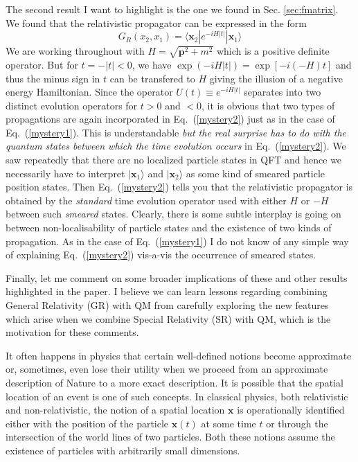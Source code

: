 \documentclass{article}
\def\eq#1{{Eq.~(\ref{#1})}}
\def\ket#1{|#1\rangle}                    %
\def\bk#1#2#3{{\langle #1|#2|#3\rangle}}  %
\begin{document}
The second result I want to highlight is the one we found in Sec. \ref{sec:fmatrix}. We found that the relativistic propagator can be expressed in the form
\begin{equation}
 G_R (x_2,x_1)  = \bk{\bm{x}_2}{e^{-iH|t|}}{\bm{x}_1}
  \label{mystery2}
\end{equation} 
We are working throughout with $H=\sqrt{\bm{p}^2+m^2} $ which is a positive definite operator.
But for $t=-|t|<0$, we have $\exp(-iH|t|) = \exp[-i(-H)t]$ and thus the minus sign in $t$ can be transfered to $H$ giving the illusion of a negative energy Hamiltonian. Since the operator $U(t) \equiv e^{-iH|t|}$ separates into two distinct evolution operators for $t>0$ and $<0$, it is obvious that two types of propagations are again incorporated in \eq{mystery2} just as in the case of \eq{mystery1}. This is understandable \textit{but the real surprise has to do with the quantum states between which the time evolution occurs} in \eq{mystery2}. We saw repeatedly that there are no localized particle states in QFT and hence we necessarily have to interpret $\ket{{\bm x}_1}$ and $\ket{{\bm x}_2}$ as some kind of smeared particle position states. Then \eq{mystery2} tells you that the relativistic propagator is obtained by the \textit{standard} time evolution operator used with either $H$ or $-H$ between such \textit{smeared} states. Clearly, there is some subtle interplay is going on between non-localisability of particle states and the existence of two kinds of propagation. As in the case of \eq{mystery1} I do not know of any simple way of explaining  \eq{mystery2} vis-a-vis the occurrence of smeared states.


Finally, let me comment on some broader implications of these and other results highlighted in the paper. 
I believe we can learn lessons regarding combining General Relativity (GR) with QM from carefully exploring the new features which arise when we combine Special Relativity (SR) with QM, which is the motivation for these comments.

It often happens in physics that certain well-defined notions  become approximate or, sometimes, even lose their utility when we proceed from an approximate description of Nature to a more exact description. It is possible that the  spatial location of an event is one of such concepts. In classical physics, both relativistic and non-relativistic, the notion of a spatial location $\bm{x}$ is operationally identified either with the position of the particle $\bm{x}(t)$ at some time $t$ or through the intersection of the world lines of two particles. Both these notions assume the existence of particles with arbitrarily small dimensions. 
\end{document}
